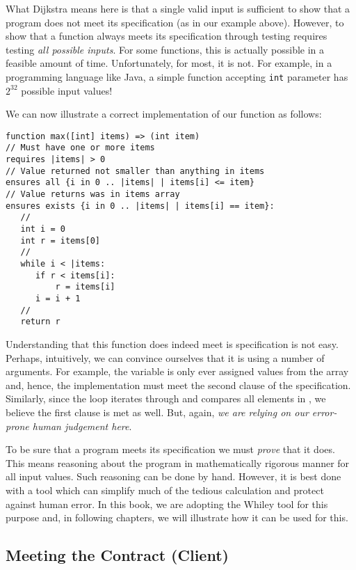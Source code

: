 What Dijkstra means here is that a single valid input is sufficient to show that a program does not meet its specification (as in our example above).  However, to show that a function always meets its specification through testing requires testing {\em all possible inputs}.  For some functions, this is actually possible in a feasible amount of time.  Unfortunately, for most, it is not.  For example, in a programming language like Java, a simple function accepting \lstinline{int} parameter has $2^{32}$ possible input values!

\begin{eg} We can now illustrate a correct implementation of our  function as follows:

\begin{lstlisting}
function max([int] items) => (int item) 
// Must have one or more items
requires |items| > 0
// Value returned not smaller than anything in items
ensures all {i in 0 .. |items| | items[i] <= item}
// Value returns was in items array
ensures exists {i in 0 .. |items| | items[i] == item}:
   //
   int i = 0
   int r = items[0]
   //
   while i < |items:
      if r < items[i]:
          r = items[i]
      i = i + 1
   //
   return r
\end{lstlisting}

Understanding that this function does indeed meet is specification is not easy.  Perhaps, intuitively, we can convince ourselves that it is using a number of arguments.  For example, the variable  is only ever assigned values from the  array and, hence, the implementation must meet the second  clause of the specification.  Similarly, since the loop iterates through and compares all elements in , we believe the first  clause is met as well.  But, again, {\em we are relying on our error-prone human judgement here}.  
\end{eg}

To be sure that a program meets its specification we must {\em prove} that it does.  This means reasoning about the program in mathematically rigorous manner for all input values.  Such reasoning can be done by hand.  However, it is best done with a tool which can simplify much of the tedious calculation and protect against human error.  In this book, we are adopting the Whiley tool for this purpose and, in following chapters, we will illustrate how it can be used for this.

\subsection{Meeting the Contract (Client)}

